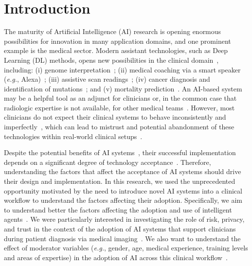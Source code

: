 \clearpage
\label{chap:chap004}

\section{Introduction}
\label{sec:chap004001}

The maturity of Artificial Intelligence (AI) research is opening enormous possibilities for innovation in many application domains, and one prominent example is the medical sector.
Modern assistant technologies, such as Deep Learning (DL) methods, opens new possibilities in the clinical domain~\cite{topol2019high}, including:
(i) genome interpretation~\cite{sundaram2018predicting};
(ii) medical coaching via a smart speaker ({\it e.g.}, Alexa)~\cite{bickmore2018patient};
(iii) assistive scan readings~\cite{madani2018deep};
(iv) cancer diagnosis and identification of mutations~\cite{coudray2018classification}; and
(v) mortality prediction~\cite{ahmad2018death}.
An AI-based system may be a helpful tool as an adjunct for clinicians or, in the common case that radiologic expertise is not available, for other medical teams~\cite{doi:10.1148/radiol.2020201874, doi:10.1148/radiol.2020190283}.
However, most clinicians do not expect their clinical systems to behave inconsistently and imperfectly~\cite{hoff2015trust, Kocielnik:2019:YAI:3290605.3300641}, which can lead to mistrust and potential abandonment of these technologies within real-world clinical setups~\cite{benrimoh2018aifred, CALISTO2021102607, CALISTO2022102285}.

Despite the potential benefits of AI systems~\cite{10.1145/3290605.3300233}, their successful implementation depends on a significant degree of technology acceptance~\cite{calisto2019midaaiarfuv, https://doi.org/10.13140/rg.2.2.25412.68486}.
Therefore, understanding the factors that affect the acceptance of AI systems should drive their design and implementation.
In this research, we used the unprecedented opportunity motivated by the need to introduce novel AI systems into a clinical workflow to understand the factors affecting their adoption.
Specifically, we aim to understand better the factors affecting the adoption and use of intelligent agents~\cite{JUNGMANN2021834, doi:10.1200/CCI.20.00148, info:doi/10.2196/12422}.
We were particularly interested in investigating the role of risk, privacy, and trust in the context of the adoption of AI systems that support clinicians during patient diagnosis via medical imaging~\cite{CALISTO2021102607, Kocielnik:2019:YAI:3290605.3300641}.
We also want to understand the effect of moderator variables ({\it e.g.}, gender, age, medical experience, training levels and areas of expertise) in the adoption of AI across this clinical workflow~\cite{Fan2020}.

